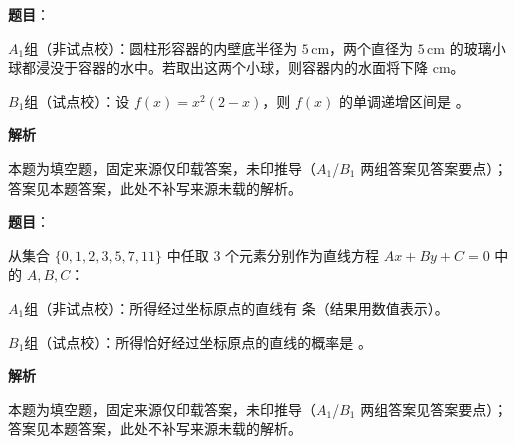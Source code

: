 \begin{answer}

\textbf{题目}：

$A_1$组（非试点校）：圆柱形容器的内壁底半径为 $5\,\mathrm{cm}$，两个直径为 $5\,\mathrm{cm}$ 的玻璃小球都浸没于容器的水中。若取出这两个小球，则容器内的水面将下降 \gkblank{} $\mathrm{cm}$。

$B_1$组（试点校）：设 $f(x)=x^2(2-x)$，则 $f(x)$ 的单调递增区间是 \gkblank{}。

\textbf{解析}

本题为填空题，固定来源仅印载答案，未印推导（$A_1$/$B_1$ 两组答案见答案要点）；答案见本题答案，此处不补写来源未载的解析。


\end{answer}
\begin{answer}

\textbf{题目}：

从集合 $\{0,1,2,3,5,7,11\}$ 中任取 3 个元素分别作为直线方程 $Ax+By+C=0$ 中的 $A,B,C$：

$A_1$组（非试点校）：所得经过坐标原点的直线有 \gkblank{} 条（结果用数值表示）。

$B_1$组（试点校）：所得恰好经过坐标原点的直线的概率是 \gkblank{}。

\textbf{解析}

本题为填空题，固定来源仅印载答案，未印推导（$A_1$/$B_1$ 两组答案见答案要点）；答案见本题答案，此处不补写来源未载的解析。


\end{answer}
